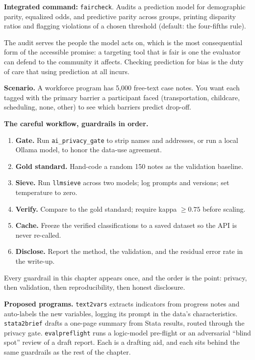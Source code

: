 \documentclass[
    a4paper,
    fontsize=10pt,
    twoside=true,
    numbers=noenddot,
]{kaobook}
\newcounter{appliedexample}
\newenvironment{appliedexample}[1][]{%
    \refstepcounter{appliedexample}%
    \begin{appliedexamplebox}[frametitle={Applied Example~\theappliedexample.~~#1}]%
}{%
    \end{appliedexamplebox}%
}
\begin{document}
\begin{kaobox}[frametitle=Package Integration: \texttt{faircheck}]
\textbf{Integrated command:} \texttt{faircheck}. Audits a prediction model for demographic parity, equalized odds, and predictive parity across groups, printing disparity ratios and flagging violations of a chosen threshold (default: the four-fifths rule).
\end{kaobox}

The audit serves the people the model acts on, which is the most consequential form of the accessible promise: a targeting tool that is fair is one the evaluator can defend to the community it affects. Checking prediction for bias is the duty of care that using prediction at all incurs.

\begin{appliedexample}[Coding 5,000 progress notes without getting burned]
\textbf{Scenario.} A workforce program has 5,000 free-text case notes. You want each tagged with the primary barrier a participant faced (transportation, childcare, scheduling, none, other) to see which barriers predict drop-off.

\medskip
\textbf{The careful workflow, guardrails in order.}
\begin{enumerate}
    \item \textbf{Gate.} Run \texttt{ai\_privacy\_gate} to strip names and addresses, or run a local Ollama model, to honor the data-use agreement.
    \item \textbf{Gold standard.} Hand-code a random 150 notes as the validation baseline.
    \item \textbf{Sieve.} Run \texttt{llmsieve} across two models; log prompts and versions; set temperature to zero.
    \item \textbf{Verify.} Compare to the gold standard; require kappa $\ge 0.75$ before scaling.
    \item \textbf{Cache.} Freeze the verified classifications to a saved dataset so the API is never re-called.
    \item \textbf{Disclose.} Report the method, the validation, and the residual error rate in the write-up.
\end{enumerate}
Every guardrail in this chapter appears once, and the order is the point: privacy, then validation, then reproducibility, then honest disclosure.
\end{appliedexample}

\begin{kaobox}[frametitle={Ado-file Ideas: \texttt{text2vars}, \texttt{stata2brief}, \texttt{evalpreflight}}]
\textbf{Proposed programs.} \texttt{text2vars} extracts indicators from progress notes and auto-labels the new variables, logging its prompt in the data's characteristics. \texttt{stata2brief} drafts a one-page summary from Stata results, routed through the privacy gate. \texttt{evalpreflight} runs a logic-model pre-flight or an adversarial \enquote{blind spot} review of a draft report. Each is a drafting aid, and each sits behind the same guardrails as the rest of the chapter.
\end{kaobox}
\end{document}
